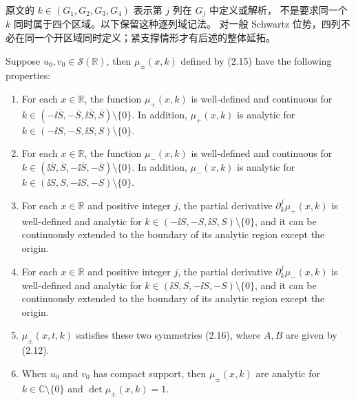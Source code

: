 \begin{note}
原文的 $k\in(G_1,G_2,G_3,G_4)$ 表示第 $j$ 列在 $G_j$ 中定义或解析，
不是要求同一个 $k$ 同时属于四个区域。以下保留这种逐列域记法。
对一般 Schwartz 位势，四列不必在同一个开区域同时定义；紧支撑情形才有后述的整体延拓。
\end{note}
\begin{paperpropositionen}\label{prop:2.1}
Suppose $u_0,v_0\in\mathcal S(\mathbb R)$, then $\mu_\pm(x,k)$ defined by (2.15) have the following properties:
\begin{enumerate}[label=\alph*.]
\item For each $x\in\mathbb R$, the function $\mu_+(x,k)$ is well-defined and continuous for $k\in(-\ii\overline S,-\overline S,\ii\overline S,\overline S)\setminus\{0\}$. In addition, $\mu_+(x,k)$ is analytic for $k\in(-\ii S,-S,\ii S,S)\setminus\{0\}$.
\item For each $x\in\mathbb R$, the function $\mu_-(x,k)$ is well-defined and continuous for $k\in(\ii\overline S,\overline S,-\ii\overline S,-\overline S)\setminus\{0\}$. In addition, $\mu_-(x,k)$ is analytic for $k\in(\ii S,S,-\ii S,-S)\setminus\{0\}$.
\item For each $x\in\mathbb R$ and positive integer $j$, the partial derivative $\partial_k^j\mu_+(x,k)$ is well-defined and analytic for $k\in(-\ii S,-S,\ii S,S)\setminus\{0\}$, and it can be continuously extended to the boundary of its analytic region except the origin.
\item For each $x\in\mathbb R$ and positive integer $j$, the partial derivative $\partial_k^j\mu_-(x,k)$ is well-defined and analytic for $k\in(\ii S,S,-\ii S,-S)\setminus\{0\}$, and it can be continuously extended to the boundary of its analytic region except the origin.
\item $\mu_\pm(x,t,k)$ satisfies these two symmetries (2.16), where $A,B$ are given by (2.12).
\item When $u_0$ and $v_0$ has compact support, then $\mu_\pm(x,k)$ are analytic for $k\in\mathbb C\setminus\{0\}$ and $\det\mu_\pm(x,k)=1$.
\end{enumerate}
\end{paperpropositionen}
